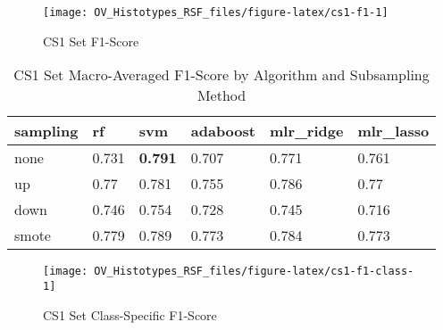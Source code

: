 \documentclass[
]{report}
\begin{document}
\begin{figure}[H]

{\centering \texttt{[image: OV\_Histotypes\_RSF\_files/figure-latex/cs1-f1-1]} 

}

\caption{CS1 Set F1-Score}\label{fig:cs1-f1}
\end{figure}

\begin{table}

\caption{\label{tab:cs1-f1-table}CS1 Set Macro-Averaged F1-Score by Algorithm and Subsampling Method}
\centering
\begin{tabular}[t]{l|l|l|l|l|l}
\hline
sampling & rf & svm & adaboost & mlr\_ridge & mlr\_lasso\\
\hline
none & 0.731 & \textbf{0.791} & 0.707 & 0.771 & 0.761\\
\hline
up & 0.77 & 0.781 & 0.755 & 0.786 & 0.77\\
\hline
down & 0.746 & 0.754 & 0.728 & 0.745 & 0.716\\
\hline
smote & 0.779 & 0.789 & 0.773 & 0.784 & 0.773\\
\hline
\end{tabular}
\end{table}

\begin{figure}[H]

{\centering \texttt{[image: OV\_Histotypes\_RSF\_files/figure-latex/cs1-f1-class-1]} 

}

\caption{CS1 Set Class-Specific F1-Score}\label{fig:cs1-f1-class}
\end{figure}
\end{document}
